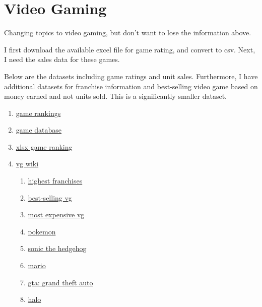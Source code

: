 \section{Video Gaming}
Changing topics to video gaming, but don't want to lose the information above.

I first download the available excel file for game rating, and convert to csv. Next, I need the sales data for these games.

Below are the datasets including game ratings and unit sales. Furthermore, I have additional datasets for franchise information and best-selling video game based on money earned and not units sold. This is a significantly smaller dataset.

\begin{enumerate}
\item \href{http://www.gamerankings.com/sites/1188-ign/index.html?platform=116}{game rankings}
\item \href{http://www.vgchartz.com/gamedb/?name=&publisher=&platform=&genre=&minSales=0&results=1000}{game database}
\item \href{https://www.dropbox.com/s/09sh15zbtwg9eu3/gamedata.xlsx}{xlsx game ranking}
\item \href{http://vgsales.wikia.com/wiki/Video_Game_Sales_Wiki}{vg wiki}
  \begin{enumerate}
  \item \href{http://vgsales.wikia.com/wiki/Best_selling_game_franchises}{highest franchises}
  \item \href{http://vgsales.wikia.com/wiki/Best_selling_games_worldwide}{best-selling vg}
  \item \href{http://vgsales.wikia.com/wiki/Most_expensive_games}{most expensive vg}
  \item \href{http://vgsales.wikia.com/wiki/Pok%C3%A9mon#Pok.C3.A9mon_sales_figure}{pokemon}
  \item \href{http://vgsales.wikia.com/wiki/Sonic}{sonic the hedgehog}
  \item \href{http://vgsales.wikia.com/wiki/Mario}{mario}
  \item \href{http://vgsales.wikia.com/wiki/Grand_Theft_Auto}{gta: grand theft auto}
  \item \href{http://vgsales.wikia.com/wiki/Halo}{halo}
  \end{enumerate}
\end{enumerate}

